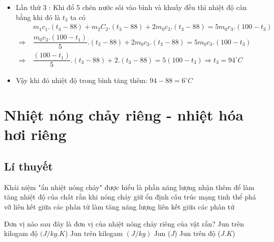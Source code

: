 \begin{ex}
{\begin{itemize}
			\item Lần thứ 3 : Khi đổ 5 chén nước sôi vào bình và khuấy đều thì nhiệt độ cân bằng khi đó là $t_3$ ta có
			\begin{align*}
				& m_1 c_1 .\left(t_3-88\right)+m_2 C_2 .\left(t_3-88\right)+2 m_0 c_3 .\left(t_3-88\right)=5 m_0 c_3 .\left(100-t_3\right) \\
				\Rightarrow \ & \dfrac{m_0 c_3 .\left(100-t_1\right)}{5} .\left(t_3-88\right)+2 m_0 c_3 .\left(t_3-88\right)=5 m_0 c_3 .\left(100-t_3\right) \\
				\Rightarrow \ & \dfrac{\left(100-t_1\right)}{5} .\left(t_3-88\right)+2 .\left(t_3-88\right)=5\left(100-t_3\right) \Rightarrow t_3=94^\circ C
			\end{align*}
			\item Vậy khi đó nhiệt độ trong bình tăng thêm: $94-88=6^\circ C$
		\end{itemize}
		
	}
\end{ex}
	
	
	
	
	
	
	
	
	
	
	
	
	
	
	
	
	
	
	
	
	
	
	
	
	
	
	
\section{Nhiệt nóng chảy riêng - nhiệt hóa hơi riêng}
\subsection{Lí thuyết}


\begin{ex} 
	Khái niệm "ẩn nhiệt nóng chảy" được hiểu là phần năng lượng nhận thêm để
	\choice
	{làm tăng nhiệt độ của chất rắn khi nóng chảy}
	{giữ ổn định cấu trúc mạng tinh thể}
	{\True phá vỡ liên kết giữa các phân tử}
	{làm tăng năng lượng liên kết giữa các phân tử}
\end{ex}
\begin{ex} 
	Đơn vị nào sau đây là đơn vị của nhiệt nóng chảy riêng của vật rắn?
	\choice
	{Jun trên kilogam độ $(J /kg.K$)}
	{\True Jun trên kilogam $(J / kg)$}
	{Jun ($J$)}
	{Jun trên độ ($J.K$)}
\end{ex}

